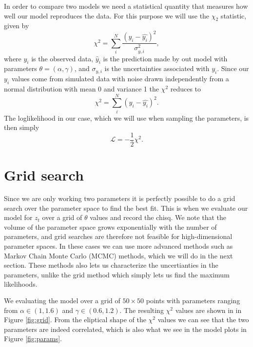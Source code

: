 \documentclass{article}
\begin{document}
In order to compare two models we need a statistical quantity that measures how well our model reproduces the data. For this purpose we will use the $\chi_2$ statistic, given by
\begin{equation}
\chi^2 = \sum_i^N \frac{\left( y_i - \hat{y_i}\right)^2}{\sigma_{y, i}^2},
\end{equation}
where $y_i$ is the observed data, $\hat{y}_i$ is the prediction made by out model with parameters $\theta = (\alpha, \gamma)$, and $\sigma_{y, i}$ is the uncertainties associated with $y_i$. Since our $y_i$ values come from simulated data with noise drawn independently from a normal distribution with mean 0 and variance 1 the $\chi^2$ reduces to
\begin{equation}\label{eq:chisq}
\chi^2 = \sum_i^N \left( y_i - \hat{y_i}\right)^2.
\end{equation}
The loglikelihood in our case, which we will use when sampling the parameters, is then simply
\begin{equation}
    \mathcal{L} = -\frac{1}{2}\chi^2.
\end{equation}

\section*{Grid search}
Since we are only working two parameters it is perfectly possible to do a grid search over the parameter space to find the best fit. This is when we evaluate our model for $z_t$ over a grid of $\theta$ values and record the chisq. We note that the volume of the parameter space grows exponentially with the number of parameters, and grid searches are therefore not feasible for high-dimensional parameter spaces. In these cases we can use more advanced methods such as Markov Chain Monte Carlo (MCMC) methods, which we will do in the next section. These methods also lets us characterize the uncertianties in the parameters, unlike the grid method which simply lets us find the maximum likelihoods.

We evaluating the model over a grid of $50 \times 50$ points with parameters ranging from $\alpha \in (1, 1.6)$ and $\gamma \in (0.6, 1.2)$. The resulting $\chi^2$ values are shown in in Figure \ref{fig:grid}. From the eliptical shape of the $\chi^2$ values we can see that the two parameters are indeed correlated, which is also what we see in the model plots in Figure \ref{fig:params}.
\end{document}
